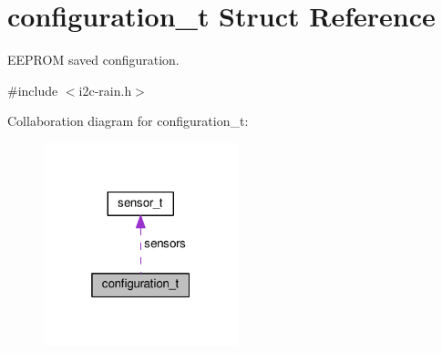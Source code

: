 \hypertarget{structconfiguration__t}{}\section{configuration\+\_\+t Struct Reference}
\label{structconfiguration__t}


E\+E\+P\+R\+OM saved configuration.  




{\ttfamily \#include $<$i2c-\/rain.\+h$>$}



Collaboration diagram for configuration\+\_\+t\+:
\nopagebreak
\begin{figure}[H]
\begin{center}
\leavevmode
\includegraphics[width=160pt]{structconfiguration__t__coll__graph}
\end{center}
\end{figure}
